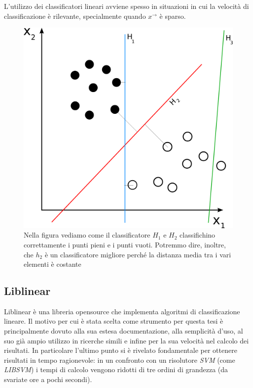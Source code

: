 \documentclass[a4paper,12pt,openright,twoside]{report}
\theoremstyle{definition}
\begin{document}
L'utilizzo dei classificatori lineari avviene spesso in situazioni in cui la velocità di classificazione
è rilevante, specialmente quando $x^\rightarrow$ è sparso.
\begin{figure}[ht]
	\centering
	\includegraphics[scale=0.2]{Immagini/liblinear_esempio.png}
	\caption{Nella figura vediamo come il classificatore $H_1$ e $H_2$ classifichino
	correttamente i punti pieni e i punti vuoti. Potremmo dire, inoltre, che $h_2$
	è un classificatore migliore perché la distanza media tra i vari elementi è costante}
	\label{fig:liblinearEx}
\end{figure}

\subsection{Liblinear}
Liblinear è una libreria opensource che implementa algoritmi di classificazione lineare. Il motivo
per cui è stata scelta come strumento per questa
tesi è principalmente dovuto alla sua estesa documentazione, alla semplicità
d'uso, al suo già ampio utilizzo in ricerche simili e infine per la sua velocità nel calcolo dei risultati. 
In particolare l'ultimo punto si è rivelato fondamentale
per ottenere risultati in tempo ragionevole: in un confronto con un risolutore \emph{SVM} (come \emph{LIBSVM})
i tempi di calcolo vengono ridotti di tre ordini di grandezza (da svariate ore a pochi secondi).
\end{document}
